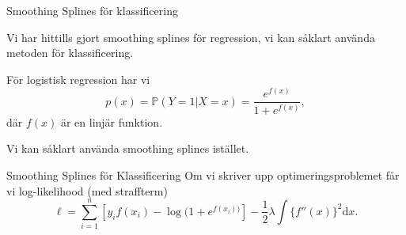 



\begin{frame}{Smoothing Splines för klassificering}
    
    Vi har hittills gjort smoothing splines för regression, vi kan såklart använda metoden för klassificering.

    För logistisk regression har vi
    \begin{equation*}
        p(x) = \mathbb{P}(Y = 1 | X = x) = \frac{e^{f(x)}}{1 + e^{f(x)}},
    \end{equation*}
    där $f(x)$ är en linjär funktion.

    Vi kan såklart använda smoothing splines istället.

\end{frame}

\begin{frame}{Smoothing Splines för Klassificering}
    Om vi skriver upp optimeringsproblemet får vi log-likelihood (med straffterm)
    \begin{equation*}
        \ell = \sum_{i=1}^{n} \left[y_i f(x_i) - \log(1 + e^{f(x_i))} \right] - \frac{1}{2}\lambda \int \{ f''(x)\}^2 \mathrm{d}x.
    \end{equation*}
\end{frame}